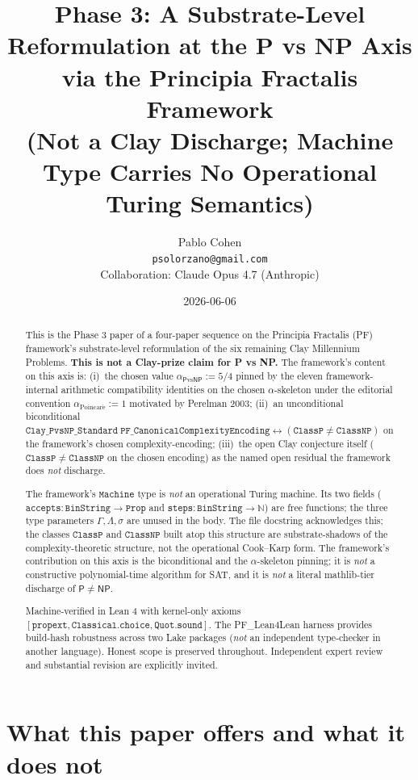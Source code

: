 \documentclass[11pt,a4paper]{article}
\title{Phase 3: A Substrate-Level Reformulation at the
P vs NP Axis\\
via the Principia Fractalis Framework\\
\large (Not a Clay Discharge; Machine Type Carries No Operational
Turing Semantics)}
\author{Pablo Cohen\\
\small{\texttt{psolorzano@gmail.com}}\\[0.3em]
\small{Collaboration: Claude Opus 4.7 (Anthropic)}}
\date{2026-06-06}
\theoremstyle{plain}
\theoremstyle{definition}
\begin{document}
\maketitle

\begin{abstract}
This is the Phase 3 paper of a four-paper sequence on the
Principia Fractalis (PF) framework's substrate-level reformulation
of the six remaining Clay Millennium Problems. \textbf{This is not a
Clay-prize claim for P vs NP.} The framework's content on this axis
is: (i)~the chosen value $\alpha_{\mathsf{P}\mathrm{vs}\mathsf{NP}}
:= 5/4$ pinned by the eleven framework-internal arithmetic
compatibility identities on the chosen $\alpha$-skeleton under the
editorial convention $\alpha_{\mathrm{Poincar\acute e}} := 1$
motivated by Perelman 2003; (ii)~an unconditional biconditional
$\mathtt{Clay\_PvsNP\_Standard\;PF\_CanonicalComplexityEncoding}
\leftrightarrow (\mathtt{ClassP} \neq \mathtt{ClassNP})$ on the
framework's chosen complexity-encoding; (iii)~the open Clay
conjecture itself ($\mathtt{ClassP} \neq \mathtt{ClassNP}$ on the
chosen encoding) as the named open residual the framework does
\emph{not} discharge.

The framework's $\mathtt{Machine}$ type is \emph{not} an operational
Turing machine. Its two fields ($\mathtt{accepts : BinString \to
Prop}$ and $\mathtt{steps : BinString \to \mathbb{N}}$) are free
functions; the three type parameters $\Gamma, \Lambda, \sigma$ are
unused in the body. The file docstring acknowledges this; the
classes $\mathtt{ClassP}$ and $\mathtt{ClassNP}$ built atop this
structure are substrate-shadows of the complexity-theoretic
structure, not the operational Cook--Karp form. The framework's
contribution on this axis is the biconditional and the
$\alpha$-skeleton pinning; it is \emph{not} a constructive
polynomial-time algorithm for SAT, and it is \emph{not} a literal
mathlib-tier discharge of $\mathsf{P} \neq \mathsf{NP}$.

Machine-verified in Lean 4 with kernel-only axioms
$\mathtt{[propext, Classical.choice, Quot.sound]}$. The
PF\_Lean4Lean harness provides build-hash robustness across two
Lake packages (\emph{not} an independent type-checker in another
language). Honest scope is preserved throughout. Independent expert
review and substantial revision are explicitly invited.
\end{abstract}

\tableofcontents

\section{What this paper offers and what it does not}
\label{sec:offers}
\end{document}
